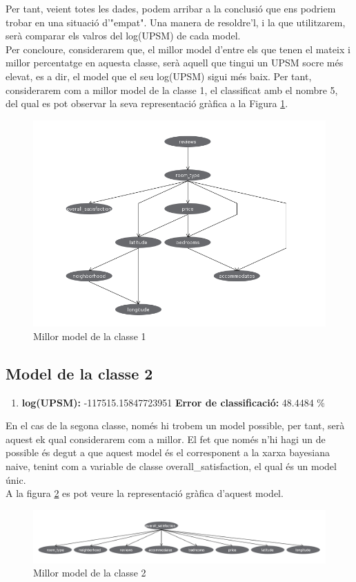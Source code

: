	Per tant, veient totes les dades, podem arribar a la conclusió que ens podriem trobar en una situació d'"empat". Una manera de resoldre'l, i la que utilitzarem, serà comparar els valros del log(UPSM) de cada model.\\
	Per concloure, considerarem que, el millor model d'entre els que tenen el mateix i millor percentatge en aquesta classe, serà aquell que tingui un UPSM socre més elevat, es a dir, el model que el seu log(UPSM) sigui més baix. Per tant, considerarem com a millor model de la classe 1, el classificat amb el nombre 5, del qual es pot observar la seva representació gràfica a la Figura \ref{fig:model1}.
	\begin{figure}[H]
		\centering
		\includegraphics[width=12cm]{imgs/modelclasse1.png}
		\caption{Millor model de la classe 1}
		\label{fig:model1}
	\end{figure}
	\vspace{0.5cm}
	
	\subsection{Model de la classe 2}
	\begin{enumerate}
		\item \textbf{log(UPSM):} -117515.15847723951 \textbf{Error de classificació:} 48.4484 \%
	\end{enumerate}
	\vspace{0.5cm}
	En el cas de la segona classe, només hi trobem un model possible, per tant, serà aquest ek qual considerarem com a millor. El fet que només n'hi hagi un de possible és degut a que aquest model és el corresponent a la xarxa bayesiana naive, tenint com a variable de classe overall\_satisfaction, el qual és un model únic.\\
	A la figura \ref{fig:model2} es pot veure la representació gràfica d'aquest model.
	\vspace{0.3cm}
	\begin{figure}[H]
		\centering
		\includegraphics[width=15cm]{imgs/model2.png}
		\caption{Millor model de la classe 2}
		\label{fig:model2}
	\end{figure}
	\vspace{0.5cm}
